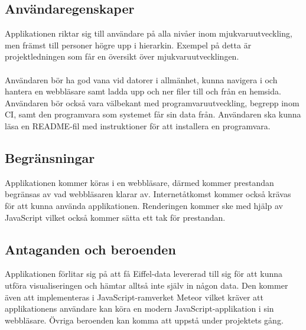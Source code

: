 \subsection{Användaregenskaper}
Applikationen riktar sig till användare på alla nivåer inom mjukvaruutveckling, men främst till personer högre upp i hierarkin. Exempel på detta är projektledningen som får en översikt över mjukvaruutvecklingen.
\\ \\
Användaren bör ha god vana vid datorer i allmänhet, kunna navigera i och hantera en webbläsare samt ladda upp och ner filer till och från en hemsida. Användaren bör också vara välbekant med programvaruutveckling, begrepp inom CI, samt den programvara som systemet får sin data från. Användaren ska kunna läsa en README-fil med instruktioner för att installera en programvara. 

\subsection{Begränsningar}
Applikationen kommer köras i en webbläsare, därmed kommer prestandan begränsas av vad webbläsaren klarar av. Internetåtkomst kommer också krävas för att kunna använda applikationen. Renderingen kommer ske med hjälp av JavaScript vilket också kommer sätta ett tak för prestandan.

\subsection{Antaganden och beroenden}
Applikationen förlitar sig på att få Eiffel-data levererad till sig för att kunna utföra visualiseringen och hämtar alltså inte själv in någon data. Den kommer även att implementeras i JavaScript-ramverket Meteor vilket kräver att applikationens användare kan köra en modern JavaScript-applikation i sin webbläsare. Övriga beroenden kan komma att uppstå under projektets gång.